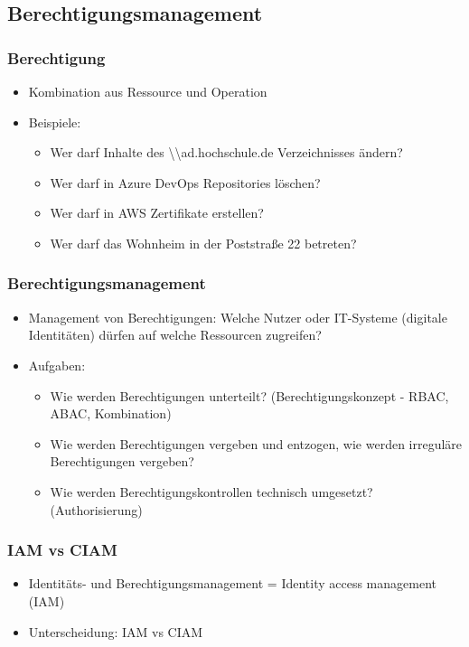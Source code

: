 \documentclass[11pt]{beamer}
\begin{document}
\subsection{Berechtigungsmanagement}
\begin{frame}
  \frametitle{Berechtigung}
  \begin{itemize}
    \item Kombination aus Ressource und Operation~
    \item Beispiele:
          \begin{itemize}
            \item Wer darf Inhalte des \textbackslash{}\textbackslash{}ad.hochschule.de Verzeichnisses ändern?
            \item Wer darf in Azure DevOps Repositories löschen?
            \item Wer darf in AWS Zertifikate erstellen?
            \item Wer darf das Wohnheim in der Poststraße 22 betreten?
          \end{itemize}
  \end{itemize}
\end{frame}

\begin{frame}
  \frametitle{Berechtigungsmanagement}
  \begin{itemize}
    \item Management von Berechtigungen: Welche Nutzer oder IT-Systeme (digitale Identitäten) dürfen auf welche Ressourcen zugreifen?
    \item Aufgaben:
          \begin{itemize}
            \item Wie werden Berechtigungen unterteilt? (Berechtigungskonzept - RBAC, ABAC, Kombination)
            \item Wie werden Berechtigungen vergeben und entzogen, wie werden irreguläre Berechtigungen vergeben?
            \item Wie werden Berechtigungskontrollen technisch umgesetzt? (Authorisierung)
          \end{itemize}
  \end{itemize}
\end{frame}

\begin{frame}
  \frametitle{IAM vs CIAM}
  \begin{itemize}
    \item Identitäts- und Berechtigungsmanagement = Identity access management (IAM)
    \item Unterscheidung: IAM vs CIAM
  \end{itemize}
\end{frame}
\end{document}
